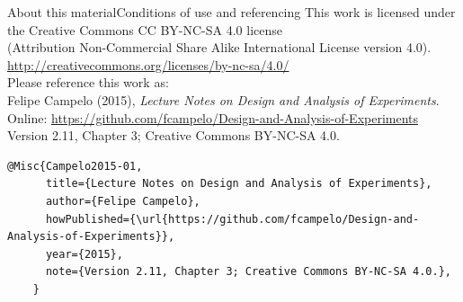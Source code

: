 \documentclass[t]{beamer}
\begin{document}

\begin{ftstf}{About this material}{Conditions of use and referencing}
\centering\footnotesize This work is licensed under the Creative Commons CC BY-NC-SA 4.0 license\\(Attribution Non-Commercial Share Alike International License version 4.0).\\
\vhalf
\url{http://creativecommons.org/licenses/by-nc-sa/4.0/}\\
\vone
\footnotesize Please reference this work as:\\
\footnotesize \flushleft Felipe Campelo (2015), \textit{Lecture Notes on Design and Analysis of Experiments}.\\Online: {\scriptsize\url{https://github.com/fcampelo/Design-and-Analysis-of-Experiments}}\\
Version 2.11, Chapter 3; Creative Commons BY-NC-SA 4.0.\\

\begin{Verbatim}[fontsize=\tiny]
    @Misc{Campelo2015-01,
      title={Lecture Notes on Design and Analysis of Experiments},
      author={Felipe Campelo},
      howPublished={\url{https://github.com/fcampelo/Design-and-Analysis-of-Experiments}},
      year={2015},
      note={Version 2.11, Chapter 3; Creative Commons BY-NC-SA 4.0.},
    }
\end{Verbatim}

\end{ftstf}
\end{document}
